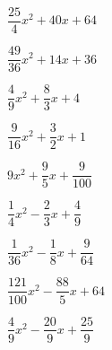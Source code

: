 \begin{esercizio}
\begin{htmulticols}{3}
\begin{enumeratea}
\item \(\dfrac{25}{4} x^{2} + 40 x + 64\) %
\item \(\dfrac{49}{36} x^{2} + 14 x + 36\) %
\item \(\dfrac{4}{9} x^{2} + \dfrac{8}{3} x + 4\) %
\item \(\dfrac{9}{16} x^{2} + \dfrac{3}{2} x + 1\) %
\item \(9 x^{2} + \dfrac{9}{5} x + \dfrac{9}{100}\) %
\item \(\dfrac{1}{4}x^{2} - \dfrac{2}{3} x + \dfrac{4}{9}\) %
\item \(\dfrac{1}{36}x^{2} - \dfrac{1}{8}x + \dfrac{9}{64}\) %
\item \(\dfrac{121}{100} x^{2} - \dfrac{88}{5} x + 64\) %
\item \(\dfrac{4}{9} x^{2} - \dfrac{20}{9} x + \dfrac{25}{9}\) %

\end{enumeratea}
\end{htmulticols}
\end{esercizio}

